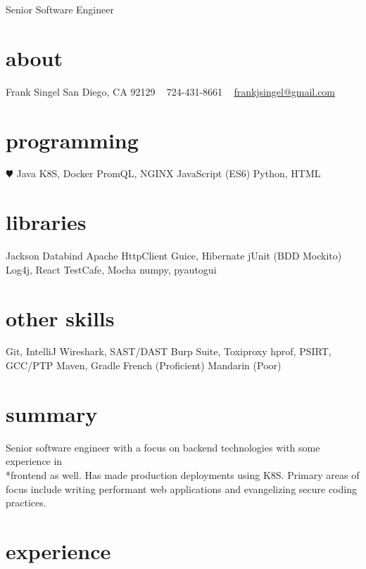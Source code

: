 \documentclass[]{friggeri-cv}
\begin{document}
       {Senior Software Engineer}


\begin{aside}
  \section{about}
    Frank Singel
    San Diego, CA
    92129
    ~
    724-431-8661
    ~
    \href{mailto:frankjsingel@gmail.com}{frankjsingel@gmail.com}
  \section{programming}
    {\color{red} $\varheartsuit$} Java
    K8S, Docker
    PromQL, NGINX
    JavaScript (ES6)
    Python, HTML
  \section{libraries}
    Jackson Databind
    Apache HttpClient 
    Guice, Hibernate
    jUnit (BDD Mockito)
    Log4j, React
    TestCafe, Mocha
    numpy, pyautogui
  \section{other skills}
    Git, IntelliJ
    Wireshark, SAST/DAST
    Burp Suite, Toxiproxy
    hprof, PSIRT, GCC/PTP
    Maven, Gradle
    French (Proficient)
    Mandarin (Poor)
\end{aside}

\section{summary}
Senior software engineer with a focus on backend technologies with some experience in \\*frontend as well. Has made production deployments using K8S. Primary areas of focus include writing performant web applications and evangelizing secure coding practices.

\section{experience}
\end{document}
